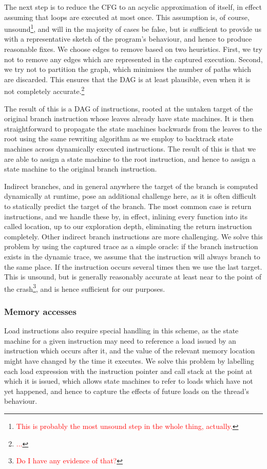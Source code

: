 \documentclass[10pt,twocolumn,preprint,natbib,authoryear]{sigplanconf}
\newcommand{\editorial}[1]{\textcolor{red}{\footnote{\textcolor{red}{#1}}}}
\begin{document}
The next step is to reduce the CFG to an acyclic approximation of
itself, in effect assuming that loops are executed at most once.  This
assumption is, of course, unsound\editorial{This is probably the most
  unsound step in the whole thing, actually.}, and will in the
majority of cases be false, but is sufficient to provide us with a
representative sketch of the program's behaviour, and hence to produce
reasonable fixes.  We choose edges to remove based on two heuristics.
First, we try not to remove any edges which are represented in the
captured execution.  Second, we try not to partition the graph, which
minimises the number of paths which are discarded.  This ensures that
the DAG is at least plausible, even when it is not completely
accurate.\editorial{...}

The result of this is a DAG of instructions, rooted at the untaken
target of the original branch instruction whose leaves already have
state machines.  It is then straightforward to propagate the state
machines backwards from the leaves to the root using the same
rewriting algorithm as we employ to backtrack state machines across
dynamically executed instructions.  The result of this is that we are
able to assign a state machine to the root instruction, and hence to
assign a state machine to the original branch instruction.

Indirect branches, and in general anywhere the target of the branch is
computed dynamically at runtime, pose an additional challenge here, as
it is often difficult to statically predict the target of the branch.
The most common case is return instructions, and we handle these by,
in effect, inlining every function into its called location, up to our
exploration depth, eliminating the return instruction completely.
Other indirect branch instructions are more challenging.  We solve
this problem by using the captured trace as a simple oracle: if the
branch instruction exists in the dynamic trace, we assume that the
instruction will always branch to the same place.  If the instruction
occurs several times then we use the last target.  This is unsound,
but is generally reasonably accurate at least near to the point of the
crash\editorial{Do I have any evidence of that?}, and is hence
sufficient for our purposes.

\subsubsection{Memory accesses}

Load instructions also require special handling in this scheme, as the
state machine for a given instruction may need to reference a load
issued by an instruction which occurs after it, and the value of the
relevant memory location might have changed by the time it executes.
We solve this problem by labelling each load expression with the
instruction pointer and call stack at the point at which it is issued,
which allows state machines to refer to loads which have not yet
happened, and hence to capture the effects of future loads on the
thread's behaviour.
\end{document}

